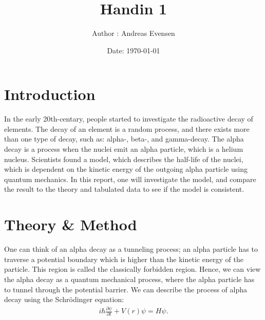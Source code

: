 \documentclass[a4paper]{article}
\title{Handin 1}
\author{Author : Andreas Evensen}
\date{Date: \today}
\newcommand{\fpartial}[2]{\frac{\partial #1}{\partial #2}}
\begin{document}

\tableofcontents
\section{Introduction}
\begin{comment}
In the early 20th-centary, people started to investigate the radioactive decay of elements.
The decay of an element is a random process, and it was found that the probability of a nucleus decaying in a given time interval is constant.
By experiments, it was found that the half-life, which is the rate of which half of the nuclei in the original sample has decayed, is a constant for a given isotope, differed very grately between different isotopes.
In this report, we will investigate one method to determine the half-life using quantum mechanics.
\end{comment}
In the early 20th-centary, people started to investigate the radioactive decay of elements.
The decay of an element is a random process, and there exists more than one type of decay, such as: alpha-, beta-, and gamma-decay.
The alpha decay is a process when the nuclei emit an alpha particle, which is a helium nucleus.
Scientists found a model, which describes the half-life of the nuclei, which is dependent on the kinetic energy of the outgoing alpha particle using quantum mechanics.
In this report, one will investigate the model, and compare the result to the theory and tabulated data to see if the model is consistent.


\newpage
\section{Theory \& Method}
One can think of an alpha decay as a tunneling process; an alpha particle has to traverse a potential boundary which is higher than the kinetic energy of the particle.
This region is called the classically forbidden region.
Hence, we can view the alpha decay as a quantum mechanical process, where the alpha particle has to tunnel through the potential barrier.
We can describe the process of alpha decay using the Schrödinger equation:
\begin{align}
    i\hbar \fpartial{\psi}{t} + V(r)\psi = H\psi. \label{eq: Schrödinger}
\end{align}
\end{document}
